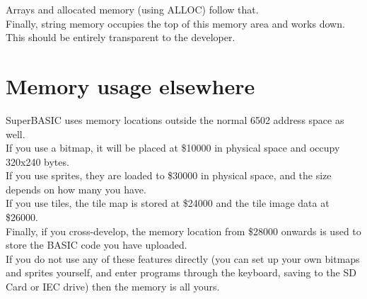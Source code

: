 Arrays and allocated memory (using ALLOC) follow that.\\

Finally, string memory occupies the top of this memory area and works down.\\

This should be entirely transparent to the developer.

\section{Memory usage elsewhere}

SuperBASIC uses memory locations outside the normal 6502 address space as well. \\

If you use a bitmap, it will be placed at \$10000 in physical space and occupy 320x240 bytes.\\

If you use sprites, they are loaded to \$30000 in physical space, and the size depends on how many you have.\\

If you use tiles, the tile map is stored at \$24000 and the tile image data at \$26000. \\

Finally, if you cross-develop, the memory location from \$28000 onwards is used to store the BASIC code you have uploaded.\\

If you do not use any of these features directly (you can set up your own bitmaps and sprites yourself, and enter programs through the keyboard, saving to the SD Card or IEC drive) then the memory is all yours.
